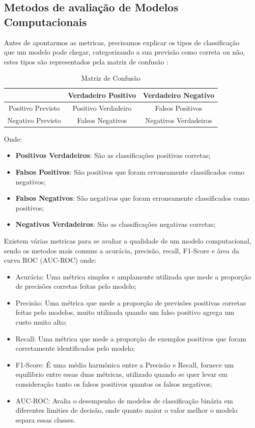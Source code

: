 \documentclass[
	12pt,				%
	openright,			%
	oneside,			%
	a4paper,			%
	english,			%
	brazil				%
	]{abntex2}
\begin{document}
\subsection{Metodos de avaliação de Modelos Computacionais}

Antes de apontarmos as metricas, precisamos explicar os tipos de classificação que um modelo pode chegar,
categorizando a sua previsão como correta ou não, estes tipos são representados pela matriz de confusão
\cite{acuracia_matriz}:

\begin{table}[h!]
	\centering
	\caption{\label{Matriz de Confusão}Matriz de Confusão}
	\begin{tabular}{|c|c|c|}
	\hline
					  & Verdadeiro Positivo & Verdadeiro Negativo   \\ \hline
	Positivo Previsto & Positivo Verdadeiro & Falsos Positivos      \\ \hline
	Negativo Previsto & Falsos Negativos    & Negativos Verdadeiros \\ \hline
	\end{tabular}
\end{table}

Onde:
\begin{itemize}
	\item \textbf{Positivos Verdadeiros}: São as classificações positivas corretas;
	\item \textbf{Falsos Positivos}: São positivos que foram erroneamente classificados como negativos;
	\item \textbf{Falsos Negativos}: São negativos que foram erroneamente classificados como positivos;
	\item \textbf{Negativos Verdadeiros}: São as classificações negativas corretas;
\end{itemize}

Existem várias metricas para se avaliar a qualidade de um modelo computacional, sendo os metodos mais
comuns a acurácia, precisão, recall, F1-Score e área da curva ROC (AUC-ROC) \cite{metricas_aval_modelo} onde:

\begin{itemize}
	\item Acurácia: Uma métrica simples e amplamente utilizada que mede a proporção de precisões corretas feitas pelo modelo;
	\item Precisão: Uma métrica que mede a proporção de previsões positivas corretas feitas pelo modelos, muito utilizada 
	quando um falso positivo agrega um custo muito alto;
	\item Recall: Uma métrica que mede a proporção de exemplos positivos que foram corretamente identificados pelo modelo;
	\item F1-Score: É uma média harmônica entre a Precisão e Recall, fornece um equilibrio entre essas duas métricas, utilizado
	quando se quer levar em consideração tanto os falsos positivos quantos os falsos negativos;
	\item AUC-ROC: Avalia o desempenho de modelos de classificação binária em diferentes limities de decisão, onde quanto
	maior o valor melhor o modelo separa essas classes.
\end{itemize}
\end{document}
